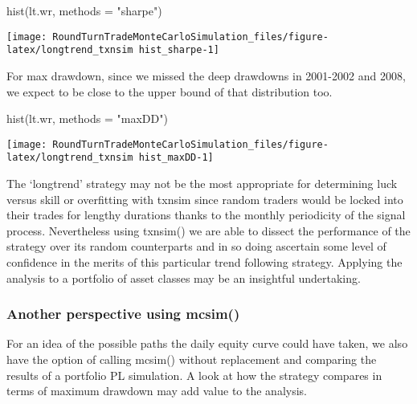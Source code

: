 \begin{Schunk}
\begin{Sinput}
hist(lt.wr, methods = "sharpe")
\end{Sinput}


\begin{center}\texttt{[image: RoundTurnTradeMonteCarloSimulation\_files/figure-latex/longtrend\_txnsim hist\_sharpe-1]} \end{center}

\end{Schunk}

For max drawdown, since we missed the deep drawdowns in 2001-2002 and
2008, we expect to be close to the upper bound of that distribution too.

\begin{Schunk}
\begin{Sinput}
hist(lt.wr, methods = "maxDD")
\end{Sinput}


\begin{center}\texttt{[image: RoundTurnTradeMonteCarloSimulation\_files/figure-latex/longtrend\_txnsim hist\_maxDD-1]} \end{center}

\end{Schunk}

The `longtrend' strategy may not be the most appropriate for determining
luck versus skill or overfitting with txnsim since random traders would
be locked into their trades for lengthy durations thanks to the monthly
periodicity of the signal process. Nevertheless using txnsim() we are
able to dissect the performance of the strategy over its random
counterparts and in so doing ascertain some level of confidence in the
merits of this particular trend following strategy. Applying the
analysis to a portfolio of asset classes may be an insightful
undertaking.

\hypertarget{another-perspective-using-mcsim}{%
\subsubsection{Another perspective using
mcsim()}\label{another-perspective-using-mcsim}}

For an idea of the possible paths the daily equity curve could have
taken, we also have the option of calling mcsim() without replacement
and comparing the results of a portfolio PL simulation. A look at how
the strategy compares in terms of maximum drawdown may add value to the
analysis.

